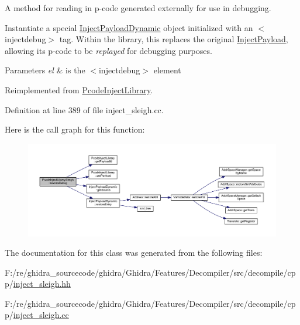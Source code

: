 A method for reading in p-\/code generated externally for use in debugging. 

Instantiate a special \mbox{\hyperlink{class_inject_payload_dynamic}{Inject\+Payload\+Dynamic}} object initialized with an $<$injectdebug$>$ tag. Within the library, this replaces the original \mbox{\hyperlink{class_inject_payload}{Inject\+Payload}}, allowing its p-\/code to be {\itshape replayed} for debugging purposes. 
\begin{DoxyParams}{Parameters}
{\em el} & is the $<$injectdebug$>$ element \\
\hline
\end{DoxyParams}


Reimplemented from \mbox{\hyperlink{class_pcode_inject_library_a48cebdddd48a1fa5db300d80ed6bdaa2}{Pcode\+Inject\+Library}}.



Definition at line 389 of file inject\+\_\+sleigh.\+cc.

Here is the call graph for this function\+:
\nopagebreak
\begin{figure}[H]
\begin{center}
\leavevmode
\includegraphics[width=350pt]{class_pcode_inject_library_sleigh_a121a82e796311b4d5b163cdf773e2235_cgraph}
\end{center}
\end{figure}


The documentation for this class was generated from the following files\+:\begin{DoxyCompactItemize}
\item 
F\+:/re/ghidra\+\_\+sourcecode/ghidra/\+Ghidra/\+Features/\+Decompiler/src/decompile/cpp/\mbox{\hyperlink{inject__sleigh_8hh}{inject\+\_\+sleigh.\+hh}}\item 
F\+:/re/ghidra\+\_\+sourcecode/ghidra/\+Ghidra/\+Features/\+Decompiler/src/decompile/cpp/\mbox{\hyperlink{inject__sleigh_8cc}{inject\+\_\+sleigh.\+cc}}\end{DoxyCompactItemize}
